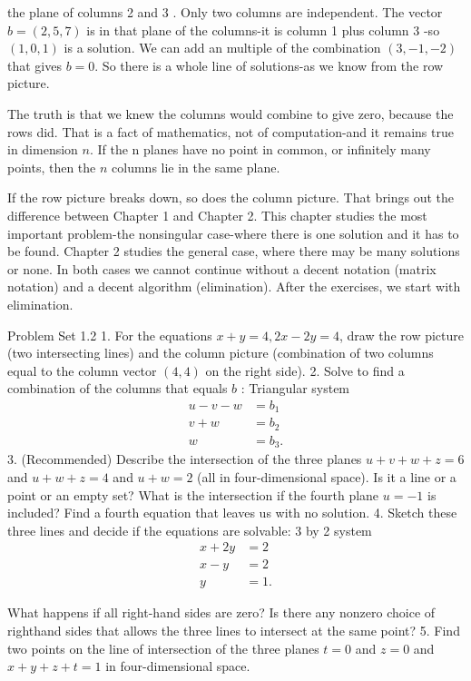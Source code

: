 the plane of columns 2 and 3 . Only two columns are independent.
The vector $b=(2,5,7)$ is in that plane of the columns-it is column 1 plus column 3 -so $(1,0,1)$ is a solution. We can add an multiple of the combination $(3,-1,-2)$ that gives $b=0$. So there is a whole line of solutions-as we know from the row picture.

The truth is that we knew the columns would combine to give zero, because the rows did. That is a fact of mathematics, not of computation-and it remains true in dimension $n$. If the n planes have no point in common, or infinitely many points, then the $n$ columns lie in the same plane.

If the row picture breaks down, so does the column picture. That brings out the difference between Chapter 1 and Chapter 2. This chapter studies the most important problem-the nonsingular case-where there is one solution and it has to be found. Chapter 2 studies the general case, where there may be many solutions or none. In both cases we cannot continue without a decent notation (matrix notation) and a decent algorithm (elimination). After the exercises, we start with elimination.

Problem Set 1.2
1. For the equations $x+y=4,2 x-2 y=4$, draw the row picture (two intersecting lines) and the column picture (combination of two columns equal to the column vector $(4,4)$ on the right side).
2. Solve to find a combination of the columns that equals $b$ :
Triangular system
$$
\begin{aligned}
u-v-w & =b_1 \\
v+w & =b_2 \\
w & =b_3 .
\end{aligned}
$$
3. (Recommended) Describe the intersection of the three planes $u+v+w+z=6$ and $u+w+z=4$ and $u+w=2$ (all in four-dimensional space). Is it a line or a point or an empty set? What is the intersection if the fourth plane $u=-1$ is included? Find a fourth equation that leaves us with no solution.
4. Sketch these three lines and decide if the equations are solvable:
3 by 2 system
$$
\begin{aligned}
x+2 y & =2 \\
x-y & =2 \\
y & =1 .
\end{aligned}
$$

What happens if all right-hand sides are zero? Is there any nonzero choice of righthand sides that allows the three lines to intersect at the same point?
5. Find two points on the line of intersection of the three planes $t=0$ and $z=0$ and $x+y+z+t=1$ in four-dimensional space.
